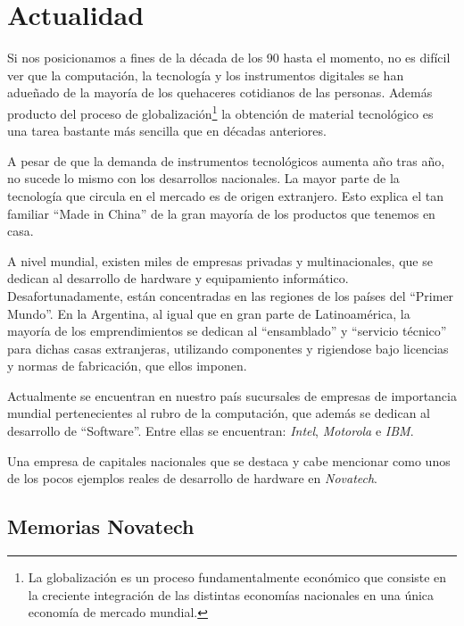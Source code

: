 \documentclass[%
 	final,
%
	notitlepage,
	narroweqnarray,
	inline,
 	twoside,
	]{ieee}
\begin{document}
\section{Actualidad }
Si nos posicionamos a fines de la d\'ecada de los 90 hasta el momento, no es dif\'icil ver que la computaci\'on, la tecnolog\'ia y los instrumentos digitales se han adue\~nado de la mayor\'ia de los quehaceres cotidianos de las personas. Adem\'as producto del proceso de globalizaci\'on\footnote{La globalizaci\'on es un proceso fundamentalmente econ\'omico que consiste en la creciente integraci\'on de las distintas econom\'ias nacionales en una \'unica econom\'ia de mercado mundial.} la obtenci\'on de material tecnol\'ogico es una tarea bastante m\'as sencilla que en d\'ecadas anteriores.

A pesar de que la demanda de instrumentos tecnol\'ogicos aumenta a\~no tras a\~no, no sucede lo mismo con los desarrollos nacionales. La mayor parte de la tecnolog\'ia que circula en el mercado es de origen extranjero. Esto explica el tan familiar ``Made in China'' de la gran mayor\'ia de los productos que tenemos en casa.

A nivel mundial, existen miles de empresas privadas y multinacionales, que se dedican al desarrollo de hardware y equipamiento inform\'atico. Desafortunadamente, est\'an concentradas en las regiones de los pa\'ises del ``Primer Mundo''. En la Argentina, al igual que en gran parte de Latinoam\'erica, la mayor\'ia de los emprendimientos se dedican al ``ensamblado'' y ``servicio t\'ecnico'' para dichas casas extranjeras, utilizando componentes y rigiendose bajo licencias y normas de fabricaci\'on, que ellos imponen.

Actualmente se encuentran en nuestro pa\'is sucursales de empresas de importancia mundial pertenecientes al rubro de la computaci\'on, que adem\'as se dedican al desarrollo de ``Software''. Entre ellas se encuentran: \textit{Intel}, \textit{Motorola} e \textit{IBM}.

Una empresa de capitales nacionales que se destaca y cabe mencionar como unos de los pocos ejemplos reales de desarrollo de hardware en \textit{Novatech}.

\subsection*{Memorias Novatech}
\end{document}
